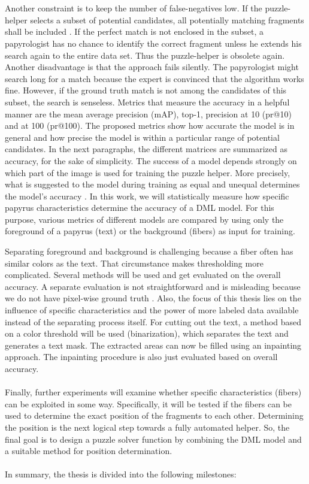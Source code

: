 \documentclass[12pt,a4paper]{article}
\begin{document}
\\\\
Another constraint is to keep the number of false-negatives low. If the puzzle-helper selects a subset of potential candidates, all potentially matching fragments shall be included . If the perfect match is not enclosed in the subset, a papyrologist has no chance to identify the correct fragment unless he extends his search again to the entire data set. Thus the puzzle-helper is obsolete again. Another disadvantage is that the approach fails silently. The papyrologist might search long for a match because the expert is convinced that the algorithm works fine. However, if the ground truth match is not among the candidates of this subset, the search is senseless. Metrics that measure the accuracy in a helpful manner are the mean average precision (mAP), top-1, precision at 10 (pr@10) and at 100 (pr@100).
The proposed metrics show how accurate the model is in general and how precise the model is within a particular range of potential candidates. In the next paragraphs, the different matrices are summarized as accuracy, for the sake of simplicity. The success of a model depends strongly on which part of the image is used for training the puzzle helper. More precisely, what is suggested to the model during training as equal and unequal determines the model's accuracy \cite{Pirrone21}. In this work, we will statistically measure how specific papyrus characteristics determine the accuracy of a DML model. For this purpose, various metrics of different models are compared by using only the foreground of a papyrus (text) or the background (fibers) as input for training. 

Separating foreground and background is challenging because a fiber often has similar colors as the text. That circumstance makes thresholding more complicated. Several methods will be used and get evaluated on the overall accuracy. A separate evaluation is not straightforward and is misleading because we do not have pixel-wise ground truth \cite{Tensmeyer20}. Also, the focus of this thesis lies on the influence of specific characteristics and the power of more labeled data available instead of the separating process itself. For cutting out the text,  a method based on a color threshold will be used (binarization), which separates the text and generates a text mask. 
The extracted areas can now be filled using an inpainting \cite{Ballester00} approach. The inpainting procedure is also just evaluated based on overall accuracy. 
\\\\
Finally, further experiments will examine whether specific characteristics (fibers) can be exploited in some way. Specifically, it will be tested if the fibers can be used to determine the exact position of the fragments to each other. Determining the position is the next logical step towards a fully automated helper. So, the final goal is to design a puzzle solver function by combining the DML model and a suitable method for position determination. 
\\\\
In summary, the thesis is divided into the following milestones:
\end{document}
